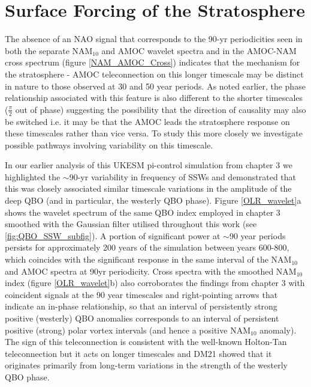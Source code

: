 \section{Surface Forcing of the Stratosphere}\label{surface-strat_forcing}
The absence of an NAO signal that corresponds to the 90-yr periodicities seen in both the separate NAM$_{10}$ and AMOC wavelet spectra and in the  AMOC-NAM cross spectrum (figure \ref{NAM_AMOC_Cross}) indicates that the mechanism for the stratosphere - AMOC teleconnection on this longer timescale may be distinct in nature to those observed at 30 and 50 year periods. As noted earlier, the phase relationship associated with this feature is also different to the shorter timescales ($\frac{\pi}{2}$ out of phase) suggesting the possibility that the direction of causality may also be switched i.e. it may be that the AMOC leads the stratosphere response on these timescales rather than vice versa. To study this more closely we investigate possible pathways involving variability on this timescale.

In our earlier analysis of this UKESM pi-control simulation from chapter 3 we highlighted the $\sim$90-yr variability in frequency of SSWs and demonstrated that this was closely associated similar timescale variations in the amplitude of the deep QBO (and in particular, the westerly QBO phase).  Figure \ref{OLR_wavelet}a shows the wavelet spectrum of the same QBO index employed in chapter 3 smoothed with the Gaussian filter utilised throughout this work (see \ref{fig:QBO_SSW_subfig}). A portion of significant power at $\sim$90 year periods persists for approximately 200 years of the simulation between years 600-800, which coincides with the significant response in the same interval of the NAM$_{10}$ and AMOC spectra at 90yr periodicity. Cross spectra with the smoothed NAM$_{10}$ index (figure \ref{OLR_wavelet}b) also corroborates the findings from chapter 3 with coincident signals at the 90 year timescales and right-pointing arrows that indicate an in-phase relationship, so that an interval of persistently strong positive (westerly) QBO anomalies  corresponds to an interval of persistent positive (strong) polar vortex intervals (and hence a positive NAM$_{10}$ anomaly). The sign of this teleconnection is consistent with the well-known Holton-Tan teleconnection \citep{luDecadalscale2008, luMechanisms2014c} but it acts on longer timescales and DM21 showed that it originates primarily from long-term variations in the strength of the westerly QBO phase. 

